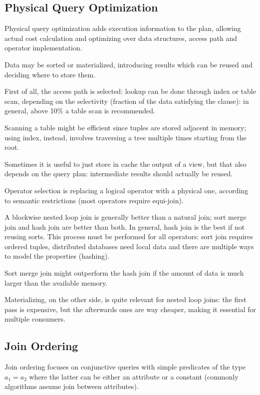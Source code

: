 \subsection{Physical Query Optimization}
Physical query optimization adds execution information to the plan, allowing actual cost calculation and optimizing over data structures, access path and operator implementation.

Data may be sorted or materialized, introducing results which can be reused and deciding where to store them.

First of all, the access path is selected: lookup can be done through index or table scan, depending on the selectivity (fraction of the data satisfying the clause): in general, above 10\% a table scan is recommended. 

Scanning a table might be efficient since tuples are stored adjacent in memory; using index, instead, involves traversing a tree multiple times starting from the root. 

Sometimes it is useful to just store in cache the output of a view, but that also depends on the query plan: intermediate results should actually be reused.

Operator selection is replacing a logical operator with a physical one, according to semantic restrictions (most operators require equi-join).

A blockwise nested loop join is generally better than a natural join; sort merge join and hash join are better than both. In general, hash join is the best if not reusing sorts. This process must be performed for all operators: sort join requires ordered tuples, distributed databases need local data and there are multiple ways to model the properties (hashing).

Sort merge join might outperform the hash join if the amount of data is much larger than the available memory.

Materializing, on the other side, is quite relevant for nested loop joins: the first pass is expensive, but the afterwards ones are way cheaper, making it essential for multiple consumers. 

\subsection{Join Ordering}
Join ordering focuses on conjunctive queries with simple predicates of the type $a_1 = a_2$ where the latter can be either an attribute or a constant (commonly algorithms assume join between attributes).

